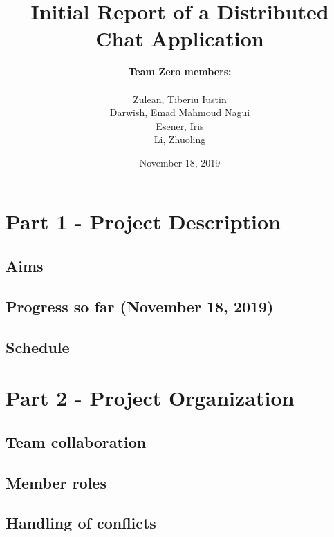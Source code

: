 \documentclass[11pt]{article}
\title{\textbf{Initial Report of a Distributed Chat Application}}
\author{\textbf{Team Zero members:} \\
		\\Zulean, Tiberiu Iustin 
		\\Darwish, Emad Mahmoud Nagui 
		\\ Esener, Iris
		\\ Li, Zhuoling
}
\date{November 18, 2019}
\begin{document}

\maketitle

\setcounter{page}{1}

\section*{Part 1 - Project Description}
\addtocounter{section}{1}
\label{part1}

\subsection{Aims}
\label{aims}



\subsection{Progress so far (November 18, 2019)}
\label{progress}



\subsection{Schedule}
\label{schedule}



\section*{Part 2 - Project Organization}
\addtocounter{section}{1}
\label{part2}

\subsection{Team collaboration}
\label{collaboration}



\subsection{Member roles}
\label{roles}



\subsection{Handling of conflicts}
\label{conflicts}


\end{document}
